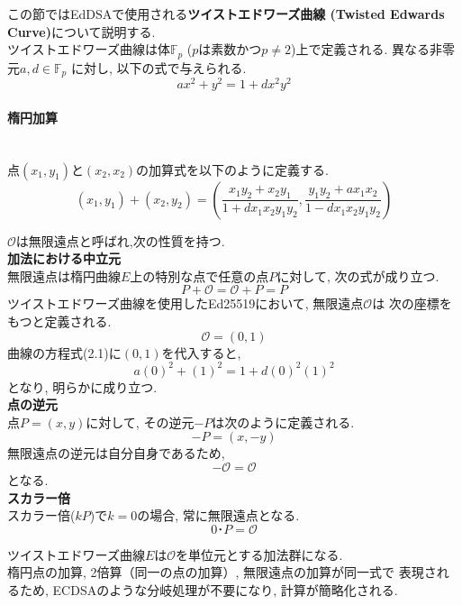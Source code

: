 この節ではEdDSAで使用される\textbf{ツイストエドワーズ曲線
(Twisted Edwards Curve)}について説明する.\\
\indent ツイストエドワーズ曲線は体$\mathbb{F}_p$ ($p$は素数かつ$p\neq 2$)上で定義される.
異なる非零元$a,d\in \mathbb{F}_p$ に対し, 以下の式で与えられる.
\begin{equation}
  ax^2 + y^2 = 1 + dx^2y^2
\end{equation}

\noindent\paragraph{楕円加算}\leavevmode\\
\indent 点$(x_1,y_1)$と$(x_2,x_2)$の加算式を以下のように定義する.
\begin{equation}
  (x_1,y_1)+(x_2,y_2)=
  \left( 
    \frac{x_1y_2+x_2y_1}{1+dx_1x_2y_1y_2},
    \frac{y_1y_2+ax_1x_2}{1-dx_1x_2y_1y_2} 
  \right)
\end{equation}
\vspace{1em}

\indent$\mathcal{O}$は無限遠点と呼ばれ,次の性質を持つ.\\
\noindent \textbf{加法における中立元}\\
\indent 無限遠点は楕円曲線$E$上の特別な点で任意の点$P$に対して, 次の式が成り立つ.
\begin{equation}
  P+\mathcal{O}=\mathcal{O}+P=P
\end{equation}
\indent ツイストエドワーズ曲線を使用したEd25519において, 無限遠点$\mathcal{O}$は
次の座標をもつと定義される.
\begin{equation}
  \mathcal{O}=(0,1)
\end{equation}
\indent 曲線の方程式(2.1)に$(0,1)$を代入すると,
\begin{equation}
  a(0)^2 + (1)^2 = 1 + d(0)^2(1)^2
\end{equation}
となり, 明らかに成り立つ.\\[1em]
\noindent \textbf{点の逆元}\\
\indent 点$P=(x,y)$に対して, その逆元$-P$は次のように定義される.
\begin{equation}
  -P=(x,-y)
\end{equation}
\indent 無限遠点の逆元は自分自身であるため, 
\begin{equation}
  -\mathcal{O}=\mathcal{O}
\end{equation}
となる.\\
\noindent \textbf{スカラー倍}\\
\indent スカラー倍($kP$)で$k=0$の場合, 常に無限遠点となる.
\begin{equation}
  0･P=\mathcal{O}
\end{equation}

\indent ツイストエドワーズ曲線$E$は$\mathcal{O}$を単位元とする加法群になる.\\
楕円点の加算, 2倍算（同一の点の加算）, 無限遠点の加算が同一式で
表現されるため, ECDSAのような分岐処理が不要になり, 計算が簡略化される.\\



